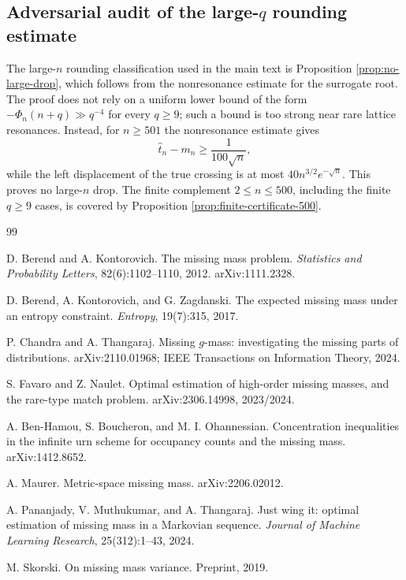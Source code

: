 \documentclass[11pt]{article}
\theoremstyle{definition}
\begin{document}
\subsection{Adversarial audit of the large-\(q\) rounding estimate}

The large-\(n\) rounding classification used in the main text is Proposition
\ref{prop:no-large-drop}, which follows from the nonresonance estimate for the
surrogate root.  The proof does not rely on a uniform lower bound of the form
\(-\Phi_n(n+q)\gg q^{-4}\) for every \(q\ge9\); such a bound is too strong near
rare lattice resonances.  Instead, for \(n\ge501\) the nonresonance estimate
gives
\[
  \widehat t_n-m_n\ge \frac{1}{100\sqrt n},
\]
while the left displacement of the true crossing is at most
\(40n^{3/2}e^{-\sqrt n}\).  This proves no large-\(n\) drop.  The finite
complement \(2\le n\le500\), including the finite \(q\ge9\) cases, is covered by
Proposition \ref{prop:finite-certificate-500}.

\begin{thebibliography}{99}

D. Berend and A. Kontorovich.
\newblock The missing mass problem.
\newblock \emph{Statistics and Probability Letters}, 82(6):1102--1110, 2012.
\newblock arXiv:1111.2328.

D. Berend, A. Kontorovich, and G. Zagdanski.
\newblock The expected missing mass under an entropy constraint.
\newblock \emph{Entropy}, 19(7):315, 2017.

P. Chandra and A. Thangaraj.
\newblock Missing $g$-mass: investigating the missing parts of distributions.
\newblock arXiv:2110.01968; IEEE Transactions on Information Theory, 2024.

S. Favaro and Z. Naulet.
\newblock Optimal estimation of high-order missing masses, and the rare-type match problem.
\newblock arXiv:2306.14998, 2023/2024.

A. Ben-Hamou, S. Boucheron, and M. I. Ohannessian.
\newblock Concentration inequalities in the infinite urn scheme for occupancy counts and the missing mass.
\newblock arXiv:1412.8652.

A. Maurer.
\newblock Metric-space missing mass.
\newblock arXiv:2206.02012.

A. Pananjady, V. Muthukumar, and A. Thangaraj.
\newblock Just wing it: optimal estimation of missing mass in a Markovian sequence.
\newblock \emph{Journal of Machine Learning Research}, 25(312):1--43, 2024.

M. Skorski.
\newblock On missing mass variance.
\newblock Preprint, 2019.

\end{thebibliography}
\end{document}
